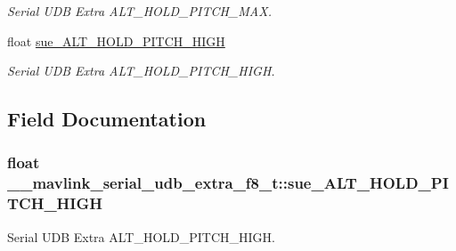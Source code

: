 \begin{DoxyCompactItemize}
\begin{DoxyCompactList}\small\item\em Serial U\+D\+B Extra A\+L\+T\+\_\+\+H\+O\+L\+D\+\_\+\+P\+I\+T\+C\+H\+\_\+\+M\+A\+X. \end{DoxyCompactList}\item 
float \hyperlink{struct____mavlink__serial__udb__extra__f8__t_af5b93689877683f804e86cc3fb220392}{sue\+\_\+\+A\+L\+T\+\_\+\+H\+O\+L\+D\+\_\+\+P\+I\+T\+C\+H\+\_\+\+H\+I\+G\+H}
\begin{DoxyCompactList}\small\item\em Serial U\+D\+B Extra A\+L\+T\+\_\+\+H\+O\+L\+D\+\_\+\+P\+I\+T\+C\+H\+\_\+\+H\+I\+G\+H. \end{DoxyCompactList}\end{DoxyCompactItemize}


\subsection{Field Documentation}
\hypertarget{struct____mavlink__serial__udb__extra__f8__t_af5b93689877683f804e86cc3fb220392}{
\subsubsection[{sue\+\_\+\+A\+L\+T\+\_\+\+H\+O\+L\+D\+\_\+\+P\+I\+T\+C\+H\+\_\+\+H\+I\+G\+H}]{\setlength{\rightskip}{0pt plus 5cm}float \+\_\+\+\_\+mavlink\+\_\+serial\+\_\+udb\+\_\+extra\+\_\+f8\+\_\+t\+::sue\+\_\+\+A\+L\+T\+\_\+\+H\+O\+L\+D\+\_\+\+P\+I\+T\+C\+H\+\_\+\+H\+I\+G\+H}}\label{struct____mavlink__serial__udb__extra__f8__t_af5b93689877683f804e86cc3fb220392}


Serial U\+D\+B Extra A\+L\+T\+\_\+\+H\+O\+L\+D\+\_\+\+P\+I\+T\+C\+H\+\_\+\+H\+I\+G\+H. 

